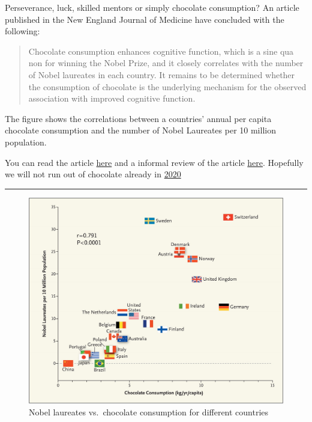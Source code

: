 \documentclass[]{article}
\begin{document}
Perseverance, luck, skilled mentors or simply chocolate consumption? An
article published in the New England Journal of Medicine have concluded
with the following:

\begin{quote}
Chocolate consumption enhances cognitive function, which is a sine qua
non for winning the Nobel Prize, and it closely correlates with the
number of Nobel laureates in each country. It remains to be determined
whether the consumption of chocolate is the underlying mechanism for the
observed association with improved cognitive function.
\end{quote}

The figure shows the correlations between a countries' annual per capita
chocolate consumption and the number of Nobel Laureates per 10 million
population.

You can read the article
\href{http://www.nejm.org/doi/full/10.1056/NEJMon1211064}{here} and a
informal review of the article
\href{https://blogs.scientificamerican.com/the-curious-wavefunction/chocolate-consumption-and-nobel-prizes-a-bizarre-juxtaposition-if-there-ever-was-one/}{here}.
Hopefully we will not run out of chocolate already in
\href{http://www.mirror.co.uk/news/world-news/chocolate-could-run-out-2020-2913505}{2020}

\begin{center}\rule{0.5\linewidth}{\linethickness}\end{center}

\begin{figure}
\centering
\includegraphics{chocolate.jpeg}
\caption{Nobel laureates vs.~chocolate consumption for different
countries}
\end{figure}
\end{document}
